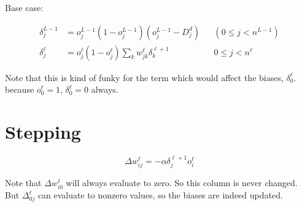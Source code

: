 \documentclass[letterpaper]{article}
\begin{document}
Base case:

\begin{align*}
    \delta_j^{L-1}&=o_j^{L-1}(1-o_j^{L-1})(o_j^{L-1}-D_j^d) & & (0\leq j < n^{L-1})\\
    \delta_j^\ell&=o_j^\ell(1-o_j^\ell)\sum_k w_{jk}^{\ell}\delta_k^{\ell+1} & & 0 \leq j < n^\ell
\end{align*}

Note that this is kind of funky for the term which would affect the biases, $\delta_0^\ell$. because 
$o_0^\ell=1$, $\delta_0^\ell=0$ always.

\section{Stepping}
$$\Delta w_{ij}^{\ell}=-\alpha \delta_j^{\ell+1} o_i^{\ell}$$

Note that $\Delta w_{i0}^\ell$ will always evaluate to zero. So this column is never changed.
But $\Delta_{0 j}^\ell$ can evaluate to nonzero values, so the biases are indeed updated.
\end{document}
